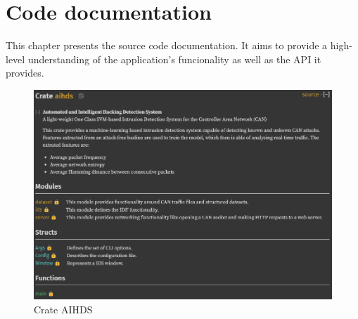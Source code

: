 \chapter{Code documentation}
\label{apdx:sec:code_documentation}

This chapter presents the source code documentation. It aims to provide a high-level understanding of the application's funcionality as well as the API it provides.

\begin{figure}
    \centering
    \includegraphics[width = \linewidth]{img/parts/docs/crate.png}
    \caption{Crate AIHDS}
    \label{fig:doc_crate}
\end{figure}

